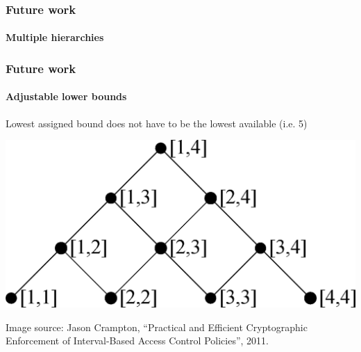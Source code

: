 \documentclass{beamer}
\begin{document}
  
  
  \begin{frame}
  	\frametitle{Future work}
  	\framesubtitle{Multiple hierarchies}
  	
  \end{frame}
  
  \begin{frame}
  	\frametitle{Future work}
  	\framesubtitle{Adjustable lower bounds}
  	Lowest assigned bound does not have to be the lowest available (i.e. 5)
  	\begin{center}
 	 	\includegraphics[scale=0.1]{images/lowerBounds/hasse.pdf}
  	\end{center}
  	\vspace*{1cm}
  	\tiny{Image source: Jason Crampton, ``Practical and Efficient Cryptographic Enforcement of Interval-Based Access Control Policies'', 2011.}

  \end{frame}
  
\end{document}
